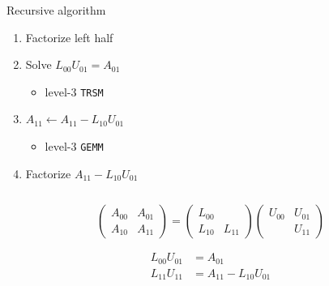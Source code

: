 \documentclass[xcolor={x11names,svgnames},x11names,svgnames]{beamer}
\begin{document}
\begin{frame}
\begin{columns}
\begin{column}{5.5cm}
 \begin{block}{Recursive algorithm}
   \begin{enumerate}
   \item<3-> Factorize left half
   \item<5-> Solve $L_{00} U_{01} = A_{01}$
     \begin{itemize}
     \item level-3 \texttt{TRSM}
     \end{itemize}
     
   \item<7-> $A_{11} \gets A_{11} - L_{10} U_{01}$
     \begin{itemize}
     \item level-3 \texttt{GEMM}
     \end{itemize}
   \item<9-> Factorize $A_{11} - L_{10} U_{01}$
     
   \end{enumerate}
 \end{block}

\end{column}
\end{columns}

\medskip

\[
  \begin{pmatrix}
       A_{00} & A_{01} \\
       A_{10} & A_{11} 
     \end{pmatrix}
     =
     \begin{pmatrix}
       L_{00} &  \\
       L_{10} & L_{11} 
     \end{pmatrix}
     \begin{pmatrix}
       U_{00} & U_{01} \\
       & U_{11} 
     \end{pmatrix}
   \]

   \vspace{-0.5cm}
   
   \begin{align*}     
     L_{00} U_{01} &= A_{01} \\
     L_{11} U_{11} &= A_{11} - L_{10} U_{01}
   \end{align*}
\end{frame}


\end{document}
